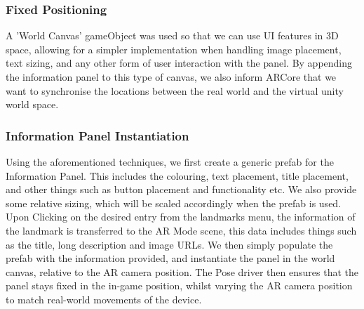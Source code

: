 \subsubsection{Fixed Positioning}
 A 'World Canvas' gameObject was used so that we can use UI features in 3D space, allowing for a simpler implementation when handling image placement, text sizing, 
 and any other form of user interaction with the panel. By appending the information panel to this type of canvas, we also inform ARCore that we want to synchronise 
 the locations between the real world and the virtual unity world space.

 \subsubsection{Information Panel Instantiation}
 Using the aforementioned techniques, we first create a generic prefab for the Information Panel. This includes the colouring, text placement, title placement, and 
 other things such as button placement and functionality etc. We also provide some relative sizing, which will be scaled accordingly when the prefab is used.\\
 Upon Clicking on the desired entry from the landmarks menu, the information of the landmark is transferred to the AR Mode scene, this data includes things such as 
 the title, long description and image URLs. We then simply populate the prefab with the information provided, and instantiate the panel in the world canvas, 
 relative to the AR camera position. The Pose driver then ensures that the panel stays fixed in the in-game position, whilst varying the AR camera position to 
 match real-world movements of the device. 




